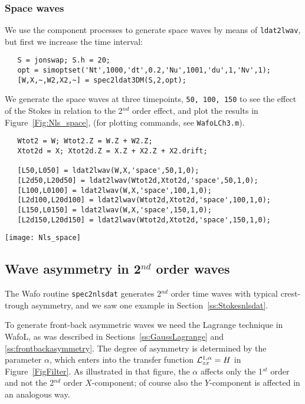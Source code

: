 \subsubsection*{Space waves}
We use the component processes to generate space waves by means of {\tt ldat2lwav}, but first we increase the time interval: 
{\small\begin{verbatim}
   S = jonswap; S.h = 20;
   opt = simoptset('Nt',1000,'dt',0.2,'Nu',1001,'du',1,'Nv',1);
   [W,X,~,W2,X2,~] = spec2ldat3DM(S,2,opt); 
\end{verbatim}
}

We generate the space waves at three timepoints, {\tt 50, 100, 150} to see the effect of the Stokes in relation to the 2$^{nd}$ order effect, and plot the results in Figure~\ref{Fig:Nls_space}, (for plotting commands, see {\tt WafoLCh3.m}). 

{\small\begin{verbatim}
   Wtot2 = W; Wtot2.Z = W.Z + W2.Z;
   Xtot2d = X; Xtot2d.Z = X.Z + X2.Z + X2.drift;
   
   [L50,L050] = ldat2lwav(W,X,'space',50,1,0);
   [L2d50,L20d50] = ldat2lwav(Wtot2d,Xtot2d,'space',50,1,0);
   [L100,L0100] = ldat2lwav(W,X,'space',100,1,0);
   [L2d100,L20d100] = ldat2lwav(Wtot2d,Xtot2d,'space',100,1,0);
   [L150,L0150] = ldat2lwav(W,X,'space',150,1,0);
   [L2d150,L20d150] = ldat2lwav(Wtot2d,Xtot2d,'space',150,1,0);
\end{verbatim}
}

\begin{SCfigure}[0.8][tbh]
\texttt{[image: Nls\_space]}
\caption{Space waves: 1$^{st}$ order (blue) and 2$^{nd}$ order with Stokes drift (red) at three different time points. Waves move from right to left.}
\label{Fig:Nls_space}
\end{SCfigure}   

\subsection{Wave asymmetry in 2$^{nd}$ order waves}\label{ss:frontbacksecondorder}
The {\sc Wafo} routine {\tt spec2nlsdat} generates 2$^{nd}$ order time waves with typical crest-trough asymmetry, and we saw one example in Section~\ref{ss:Stokesnlsdat}.
 
To generate front-back asymmetric waves we need the Lagrange technique in {\sc Wafo}L, as was described in Sections~\ref{ss:GaussLagrange} and \ref{ss:frontbackasymmetry}. The degree of asymmetry is determined by the parameter $\alpha$, which enters into the transfer function 
${\cal L}_{zx}^{1,\alpha} = H$ in Figure~\ref{FigFilter}. As illustrated in that figure, the $\alpha$  affects only the 1$^{st}$ order and not the 2$^{nd}$ order $X$-component; of course also the $Y$-component is affected in an analogous way. 

